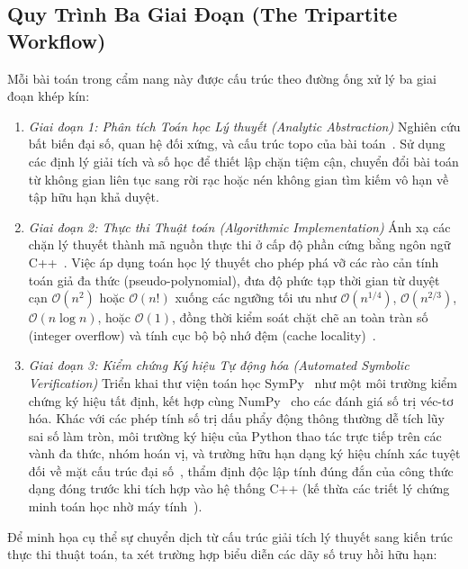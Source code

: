 \documentclass{article}
\begin{document}
\subsection{Quy Trình Ba Giai Đoạn (The Tripartite Workflow)}
Mỗi bài toán trong cẩm nang này được cấu trúc theo đường ống xử lý ba giai đoạn khép kín:
\begin{enumerate}
\item \emph{Giai đoạn 1: Phân tích Toán học Lý thuyết (Analytic Abstraction)}
 Nghiên cứu bất biến đại số, quan hệ đối xứng, và cấu trúc topo của bài toán~\cite{tao2007goodmath, tao2006solving}. Sử dụng các định lý giải tích và số học để thiết lập chặn tiệm cận, chuyển đổi bài toán từ không gian liên tục sang rời rạc hoặc nén không gian tìm kiếm vô hạn về tập hữu hạn khả duyệt.
 
\item \emph{Giai đoạn 2: Thực thi Thuật toán (Algorithmic Implementation)}
 Ánh xạ các chặn lý thuyết thành mã nguồn thực thi ở cấp độ phần cứng bằng ngôn ngữ C++~\cite{stroustrup2013c}. Việc áp dụng toán học lý thuyết cho phép phá vỡ các rào cản tính toán giả đa thức (pseudo-polynomial), đưa độ phức tạp thời gian từ duyệt cạn $\mathcal{O}(n^2)$ hoặc $\mathcal{O}(n!)$ xuống các ngưỡng tối ưu như $\mathcal{O}(n^{1/4})$, $\mathcal{O}(n^{2/3})$, $\mathcal{O}(n \log n)$, hoặc $\mathcal{O}(1)$, đồng thời kiểm soát chặt chẽ an toàn tràn số (integer overflow) và tính cục bộ bộ nhớ đệm (cache locality)~\cite{knuth1997art}.
 
\item \emph{Giai đoạn 3: Kiểm chứng Ký hiệu Tự động hóa (Automated Symbolic Verification)}
 Triển khai thư viện toán học \textsf{SymPy}~\cite{meurer2017sympy} như một môi trường kiểm chứng ký hiệu tất định, kết hợp cùng \textsf{NumPy}~\cite{harris2020array} cho các đánh giá số trị véc-tơ hóa. Khác với các phép tính số trị dấu phẩy động thông thường dễ tích lũy sai số làm tròn, môi trường ký hiệu của Python thao tác trực tiếp trên các vành đa thức, nhóm hoán vị, và trường hữu hạn dạng ký hiệu chính xác tuyệt đối về mặt cấu trúc đại số~\cite{ousterhout1998scripting}, thẩm định độc lập tính đúng đắn của công thức dạng đóng trước khi tích hợp vào hệ thống C++ (kế thừa các triết lý chứng minh toán học nhờ máy tính~\cite{appel1977every, hales2005proof}).
\end{enumerate}

Để minh họa cụ thể sự chuyển dịch từ cấu trúc giải tích lý thuyết sang kiến trúc thực thi thuật toán, ta xét trường hợp biểu diễn các dãy số truy hồi hữu hạn:
\end{document}
